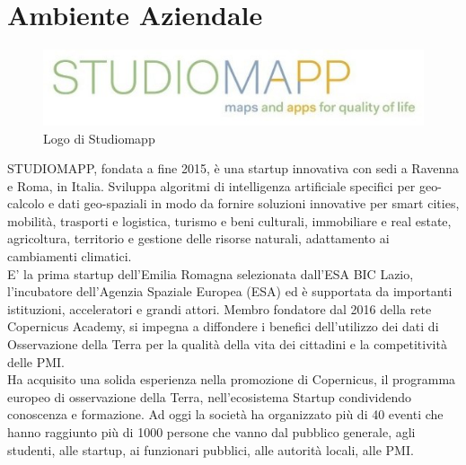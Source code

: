 
\section{Ambiente Aziendale}
\begin{figure}[H]
	\centering
	\includegraphics[width=\linewidth]{images/studiomapp.jpg}
	\caption{Logo di Studiomapp}
	\label{Logo di Studiomapp}
\end{figure}
STUDIOMAPP\cite{studiomapp}, fondata a fine 2015, è una startup innovativa con sedi a Ravenna e Roma, in Italia.
Sviluppa algoritmi di intelligenza artificiale specifici per geo-calcolo e dati geo-spaziali in modo da fornire soluzioni innovative per smart cities, mobilità, trasporti e logistica, turismo e beni culturali, immobiliare e real estate, agricoltura, territorio e gestione delle risorse naturali, adattamento ai cambiamenti climatici.\\

E' la prima startup dell'Emilia Romagna selezionata dall'ESA BIC Lazio, l'incubatore dell'Agenzia Spaziale Europea (ESA) ed è supportata da importanti istituzioni, acceleratori e grandi attori.
Membro fondatore dal 2016 della rete Copernicus Academy, si impegna a diffondere i benefici dell'utilizzo dei dati di Osservazione della Terra per la qualità della vita dei cittadini e la competitività delle PMI.\\

Ha acquisito una solida esperienza nella promozione di Copernicus, il programma europeo di osservazione della Terra, nell'ecosistema Startup condividendo conoscenza e formazione. Ad oggi la società ha organizzato più di 40 eventi che hanno raggiunto più di 1000 persone che vanno dal pubblico generale, agli studenti, alle startup, ai funzionari pubblici, alle autorità locali, alle PMI.